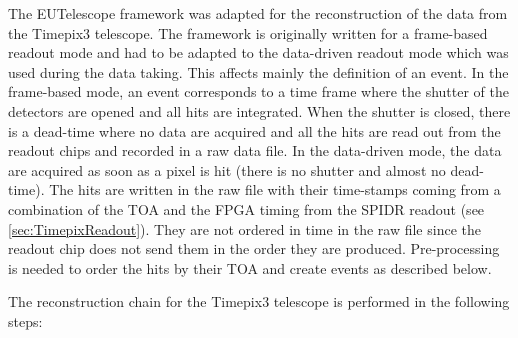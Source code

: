 The EUTelescope framework was adapted for the reconstruction of the
data from the Timepix3 telescope. The framework is originally written
for a frame-based readout mode and had to be adapted to the
data-driven readout mode which was used during the data taking. This
affects mainly the definition of an event. In the frame-based mode, an
event corresponds to a time frame where the shutter of the detectors
are opened and all hits are integrated. When the shutter is closed,
there is a dead-time where no data are acquired and all the hits are
read out from the readout chips and recorded in a raw data file. In
the data-driven mode, the data are acquired as soon as a pixel is hit
(there is no shutter and almost no dead-time). The hits are written in
the raw file with their time-stamps coming from a combination of the
TOA and the FPGA timing from the SPIDR readout (see
\cref{sec:TimepixReadout}). They are not ordered in time in the raw
file since the readout chip does not send them in the order they are
produced. Pre-processing is needed to order the hits by their TOA and
create events as described below.

The reconstruction chain for the Timepix3 telescope is performed in
the following steps:

